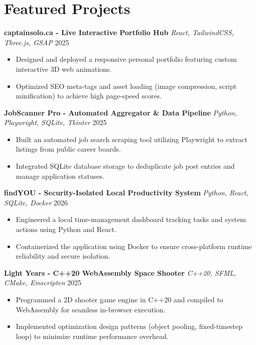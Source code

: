 \documentclass[a4paper,10pt]{article}
\begin{document}
\section*{Featured Projects}
\textbf{captainsolo.ca - Live Interactive Portfolio Hub} \enspace\textbar\enspace \textit{React, TailwindCSS, Three.js, GSAP} \hfill 2025 \\
\begin{itemize}
    \item Designed and deployed a responsive personal portfolio featuring custom interactive 3D web animations.
    \item Optimized SEO meta-tags and asset loading (image compression, script minification) to achieve high page-speed scores.
\end{itemize}

\vspace{3pt}
\textbf{JobScanner Pro - Automated Aggregator \& Data Pipeline} \enspace\textbar\enspace \textit{Python, Playwright, SQLite, Tkinter} \hfill 2025 \\
\begin{itemize}
    \item Built an automated job search scraping tool utilizing Playwright to extract listings from public career boards.
    \item Integrated SQLite database storage to deduplicate job post entries and manage application statuses.
\end{itemize}

\vspace{3pt}
\textbf{findYOU - Security-Isolated Local Productivity System} \enspace\textbar\enspace \textit{Python, React, SQLite, Docker} \hfill 2026 \\
\begin{itemize}
    \item Engineered a local time-management dashboard tracking tasks and system actions using Python and React.
    \item Containerized the application using Docker to ensure cross-platform runtime reliability and secure isolation.
\end{itemize}

\vspace{3pt}
\textbf{Light Years - C++20 WebAssembly Space Shooter} \enspace\textbar\enspace \textit{C++20, SFML, CMake, Emscripten} \hfill 2025 \\
\begin{itemize}
    \item Programmed a 2D shooter game engine in C++20 and compiled to WebAssembly for seamless in-browser execution.
    \item Implemented optimization design patterns (object pooling, fixed-timestep loop) to minimize runtime performance overhead.
\end{itemize}
\end{document}
